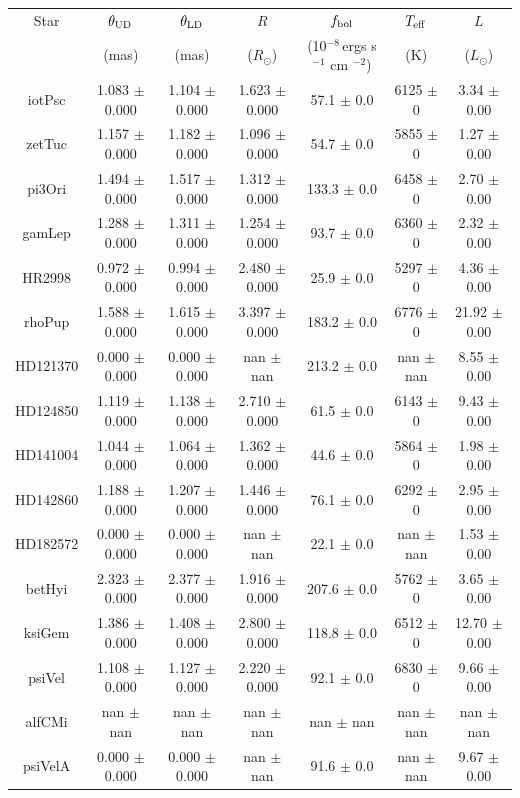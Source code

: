 \begin{tabular}{ccccccc}
\hline
Star & $\theta_{\rm UD}$ & $\theta_{\rm LD}$ & $R$ & $f_{\rm bol}$ & $T_{\rm eff}$ & $L$ \\
 & (mas) & (mas) & ($R_\odot$) & (10$^{-8}\,$ergs s$^{-1}$ cm $^{-2}$) & (K) & ($L_\odot$) \\
\hline
iotPsc & 1.083 $\pm$ 0.000 & 1.104 $\pm$ 0.000 & 1.623 $\pm$ 0.000 & 57.1 $\pm$ 0.0 &6125 $\pm$ 0 & 3.34 $\pm$ 0.00 \\
zetTuc & 1.157 $\pm$ 0.000 & 1.182 $\pm$ 0.000 & 1.096 $\pm$ 0.000 & 54.7 $\pm$ 0.0 &5855 $\pm$ 0 & 1.27 $\pm$ 0.00 \\
pi3Ori & 1.494 $\pm$ 0.000 & 1.517 $\pm$ 0.000 & 1.312 $\pm$ 0.000 &133.3 $\pm$ 0.0 &6458 $\pm$ 0 & 2.70 $\pm$ 0.00 \\
gamLep & 1.288 $\pm$ 0.000 & 1.311 $\pm$ 0.000 & 1.254 $\pm$ 0.000 & 93.7 $\pm$ 0.0 &6360 $\pm$ 0 & 2.32 $\pm$ 0.00 \\
HR2998 & 0.972 $\pm$ 0.000 & 0.994 $\pm$ 0.000 & 2.480 $\pm$ 0.000 & 25.9 $\pm$ 0.0 &5297 $\pm$ 0 & 4.36 $\pm$ 0.00 \\
rhoPup & 1.588 $\pm$ 0.000 & 1.615 $\pm$ 0.000 & 3.397 $\pm$ 0.000 &183.2 $\pm$ 0.0 &6776 $\pm$ 0 & 21.92 $\pm$ 0.00 \\
HD121370 & 0.000 $\pm$ 0.000 & 0.000 $\pm$ 0.000 & nan $\pm$ nan &213.2 $\pm$ 0.0 &nan $\pm$ nan & 8.55 $\pm$ 0.00 \\
HD124850 & 1.119 $\pm$ 0.000 & 1.138 $\pm$ 0.000 & 2.710 $\pm$ 0.000 & 61.5 $\pm$ 0.0 &6143 $\pm$ 0 & 9.43 $\pm$ 0.00 \\
HD141004 & 1.044 $\pm$ 0.000 & 1.064 $\pm$ 0.000 & 1.362 $\pm$ 0.000 & 44.6 $\pm$ 0.0 &5864 $\pm$ 0 & 1.98 $\pm$ 0.00 \\
HD142860 & 1.188 $\pm$ 0.000 & 1.207 $\pm$ 0.000 & 1.446 $\pm$ 0.000 & 76.1 $\pm$ 0.0 &6292 $\pm$ 0 & 2.95 $\pm$ 0.00 \\
HD182572 & 0.000 $\pm$ 0.000 & 0.000 $\pm$ 0.000 & nan $\pm$ nan & 22.1 $\pm$ 0.0 &nan $\pm$ nan & 1.53 $\pm$ 0.00 \\
betHyi & 2.323 $\pm$ 0.000 & 2.377 $\pm$ 0.000 & 1.916 $\pm$ 0.000 &207.6 $\pm$ 0.0 &5762 $\pm$ 0 & 3.65 $\pm$ 0.00 \\
ksiGem & 1.386 $\pm$ 0.000 & 1.408 $\pm$ 0.000 & 2.800 $\pm$ 0.000 &118.8 $\pm$ 0.0 &6512 $\pm$ 0 & 12.70 $\pm$ 0.00 \\
psiVel & 1.108 $\pm$ 0.000 & 1.127 $\pm$ 0.000 & 2.220 $\pm$ 0.000 & 92.1 $\pm$ 0.0 &6830 $\pm$ 0 & 9.66 $\pm$ 0.00 \\
alfCMi & nan $\pm$ nan & nan $\pm$ nan & nan $\pm$ nan &  nan $\pm$ nan &nan $\pm$ nan & nan $\pm$ nan \\
psiVelA & 0.000 $\pm$ 0.000 & 0.000 $\pm$ 0.000 & nan $\pm$ nan & 91.6 $\pm$ 0.0 &nan $\pm$ nan & 9.67 $\pm$ 0.00 \\
\hline
\end{tabular}
